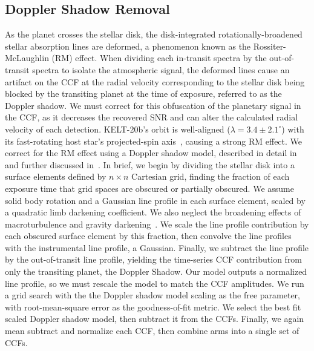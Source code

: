 \documentclass[twocolumn]{aastex631}
\begin{document}
        \subsection{Doppler Shadow Removal}
            As the planet crosses the stellar disk, the disk-integrated rotationally-broadened stellar absorption lines are deformed, a phenomenon known as the Rossiter-McLaughlin (RM) effect. When dividing each in-transit spectra by the out-of-transit spectra to isolate the atmospheric signal, the deformed lines cause an artifact on the CCF at the radial velocity corresponding to the stellar disk being blocked by the transiting planet at the time of exposure, referred to as the Doppler shadow. We must correct for this obfuscation of the planetary signal in the CCF, as it decreases the recovered SNR and can alter the calculated radial velocity of each detection. KELT-20b's orbit is well-aligned ($\lambda = 3.4 \pm 2.1 ^{\circ}$) with its fast-rotating host star's projected-spin axis~\citep{Lund2017}, causing a strong RM effect. We correct for the RM effect using a Doppler shadow model, described in detail in~\citet{Johnson2016} and further discussed in~\citep{Johnson2014, Johnson2017}. In brief, we begin by dividing the stellar disk into a surface elements defined by $n \times n$ Cartesian grid, finding the fraction of each exposure time that grid spaces are obscured or partially obscured. We assume solid body rotation and a Gaussian line profile in each surface element, scaled by a quadratic limb darkening coefficient. We also neglect the broadening effects of macroturbulence and gravity darkening~\citet{Johnson2016}. We scale the line profile contribution by each obscured surface element by this fraction, then convolve the line profiles with the instrumental line profile, a Gaussian. Finally, we subtract the line profile by the out-of-transit line profile, yielding the time-series CCF contribution from only the transiting planet, the Doppler Shadow. Our model outputs a normalized line profile, so we must rescale the model to match the CCF amplitudes. We run a grid search with the the Doppler shadow model scaling as the free parameter, with root-mean-square error as the goodness-of-fit metric. We select the best fit scaled Doppler shadow model, then subtract it from the CCFs. Finally, we again mean subtract and normalize each CCF, then combine arms into a single set of CCFs.
            
\end{document}
